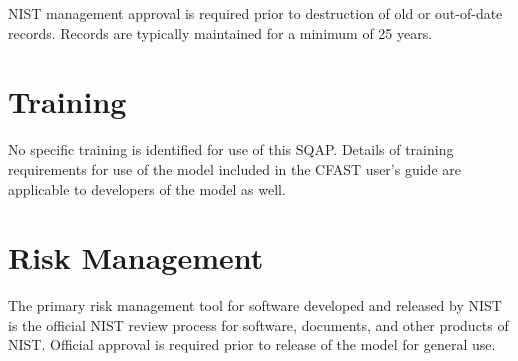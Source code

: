 NIST management approval is required prior to destruction of old or out-of-date records. Records are typically maintained for a minimum of 25 years.

\section{Training}

No specific training is identified for use of this SQAP.  Details of training requirements for use of the model included in the CFAST user's guide are applicable to developers of the model as well.

\section{Risk Management}

The primary risk management tool for software developed and released by NIST is the official NIST review process for software, documents, and other products of NIST. Official approval is required prior to release of the model for general use.
